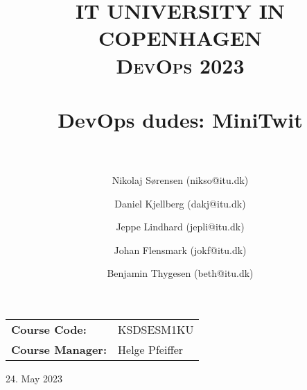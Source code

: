 
\title{ \normalsize \textsc{\uppercase{IT University in Copenhagen}} \\ [0.5cm]
        \small \textsc{DevOps 2023} \\ [1.5cm]
		\HRule{0.5pt} \\
		\LARGE \textbf{DevOps dudes: MiniTwit} \\
		\HRule{2pt} \\ [0.3cm]
		\normalsize  }

\date{}

\author{
		Nikolaj Sørensen (nikso@itu.dk) \and
            Daniel Kjellberg (dakj@itu.dk) \and
            Jeppe Lindhard (jepli@itu.dk) \and
            Johan Flensmark (jokf@itu.dk) \and
            Benjamin Thygesen (beth@itu.dk)
        }

\maketitle

\begin{table}[H]
\small
\centering
\begin{tabular}{l l}
    \textbf{Course Code:} & KSDSESM1KU \\
    \textbf{Course Manager:} & Helge Pfeiffer
\end{tabular}%
\end{table}



\vspace{\fill}

\begin{center}
    24. May 2023
\end{center}

\newpage
\thispagestyle{empty}
\tableofcontents
{}
\newpage

\setcounter{page}{1}